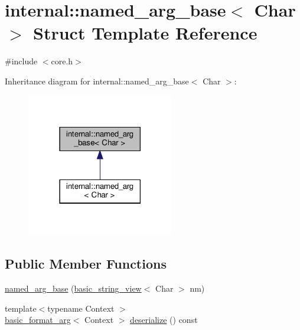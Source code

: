 \hypertarget{structinternal_1_1named__arg__base}{}\section{internal\+:\+:named\+\_\+arg\+\_\+base$<$ Char $>$ Struct Template Reference}
\label{structinternal_1_1named__arg__base}


{\ttfamily \#include $<$core.\+h$>$}



Inheritance diagram for internal\+:\+:named\+\_\+arg\+\_\+base$<$ Char $>$\+:
\nopagebreak
\begin{figure}[H]
\begin{center}
\leavevmode
\includegraphics[width=182pt]{structinternal_1_1named__arg__base__inherit__graph}
\end{center}
\end{figure}
\subsection*{Public Member Functions}
\begin{DoxyCompactItemize}
\item 
\hyperlink{structinternal_1_1named__arg__base_aafeb592879eaf163dea5d7a74219fba5}{named\+\_\+arg\+\_\+base} (\hyperlink{classbasic__string__view}{basic\+\_\+string\+\_\+view}$<$ Char $>$ nm)
\item 
{\footnotesize template$<$typename Context $>$ }\\\hyperlink{classbasic__format__arg}{basic\+\_\+format\+\_\+arg}$<$ Context $>$ \hyperlink{structinternal_1_1named__arg__base_ac9c635fcb1ecc29ef4aacfb73c870292}{deserialize} () const
\end{DoxyCompactItemize}
